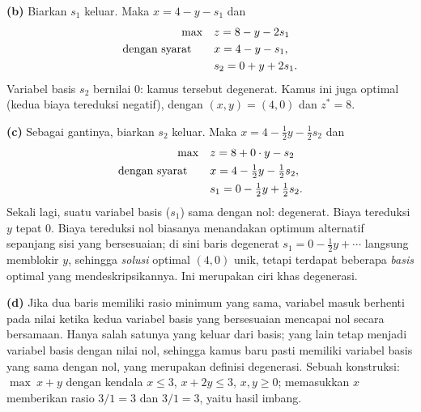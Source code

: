\textbf{(b)} Biarkan $s_1$ keluar. Maka $x = 4 - y - s_1$ dan
\[
\begin{aligned}
\max\quad & z = 8 - y - 2s_1 \\
\mbox{dengan syarat}\quad\quad & x = 4 - y - s_1, \\
& s_2 = 0 + y + 2s_1.
\end{aligned}
\]
Variabel basis $s_2$ bernilai $0$: kamus tersebut degenerat. Kamus ini
juga optimal (kedua biaya tereduksi negatif), dengan $(x, y) = (4, 0)$ dan
$z^* = 8$.

\textbf{(c)} Sebagai gantinya, biarkan $s_2$ keluar. Maka
$x = 4 - \tfrac12 y - \tfrac12 s_2$ dan
\[
\begin{aligned}
\max\quad & z = 8 + 0 \cdot y - s_2 \\
\mbox{dengan syarat}\quad\quad & x = 4 - \tfrac12 y - \tfrac12 s_2, \\
& s_1 = 0 - \tfrac12 y + \tfrac12 s_2.
\end{aligned}
\]
Sekali lagi, suatu variabel basis ($s_1$) sama dengan nol: degenerat. Biaya tereduksi
$y$ tepat $0$. Biaya tereduksi nol biasanya menandakan optimum alternatif
sepanjang sisi yang bersesuaian; di sini baris degenerat
$s_1 = 0 - \tfrac12 y + \cdots$ langsung memblokir $y$, sehingga
\emph{solusi} optimal $(4, 0)$ unik, tetapi terdapat beberapa
\emph{basis} optimal yang mendeskripsikannya. Ini merupakan ciri khas degenerasi.

\textbf{(d)} Jika dua baris memiliki rasio minimum yang sama, variabel masuk
berhenti pada nilai ketika kedua variabel basis yang bersesuaian mencapai nol
secara bersamaan. Hanya salah satunya yang keluar dari basis; yang lain tetap
menjadi variabel basis dengan nilai nol, sehingga kamus baru pasti memiliki variabel basis
yang sama dengan nol, yang merupakan definisi degenerasi. Sebuah
konstruksi: $\max\ x + y$ dengan kendala $x \leq 3$, $x + 2y \leq 3$,
$x, y \geq 0$; memasukkan $x$ memberikan rasio $3/1 = 3$ dan $3/1 = 3$, yaitu hasil imbang.
